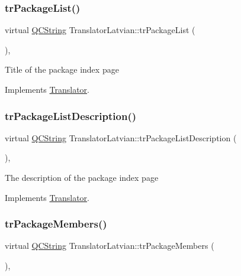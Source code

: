 \subsubsection{\texorpdfstring{trPackageList()}{trPackageList()}}
{\footnotesize\ttfamily virtual \mbox{\hyperlink{class_q_c_string}{Q\+C\+String}} Translator\+Latvian\+::tr\+Package\+List (\begin{DoxyParamCaption}{ }\end{DoxyParamCaption})\hspace{0.3cm}{\ttfamily [inline]}, {\ttfamily [virtual]}}

Title of the package index page 

Implements \mbox{\hyperlink{class_translator}{Translator}}.

\mbox{\label{class_translator_latvian_a2ce4c653c8157341eb5da8e3275a1861}} 
\subsubsection{\texorpdfstring{trPackageListDescription()}{trPackageListDescription()}}
{\footnotesize\ttfamily virtual \mbox{\hyperlink{class_q_c_string}{Q\+C\+String}} Translator\+Latvian\+::tr\+Package\+List\+Description (\begin{DoxyParamCaption}{ }\end{DoxyParamCaption})\hspace{0.3cm}{\ttfamily [inline]}, {\ttfamily [virtual]}}

The description of the package index page 

Implements \mbox{\hyperlink{class_translator}{Translator}}.

\mbox{\label{class_translator_latvian_afca38b5858a41a8b6abbabecd056c190}} 
\subsubsection{\texorpdfstring{trPackageMembers()}{trPackageMembers()}}
{\footnotesize\ttfamily virtual \mbox{\hyperlink{class_q_c_string}{Q\+C\+String}} Translator\+Latvian\+::tr\+Package\+Members (\begin{DoxyParamCaption}{ }\end{DoxyParamCaption})\hspace{0.3cm}{\ttfamily [inline]}, {\ttfamily [virtual]}}


